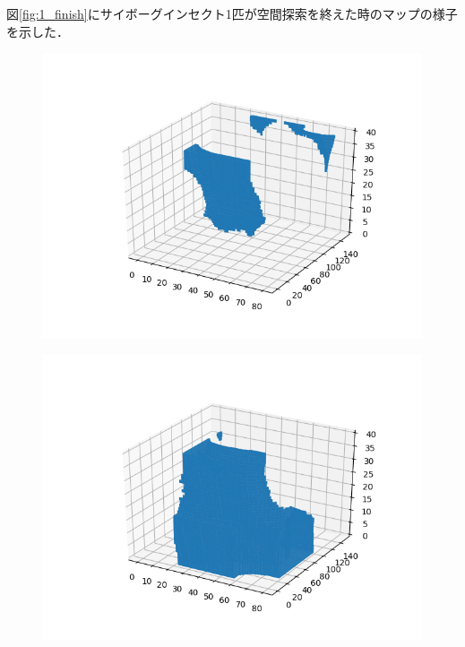 \documentclass[a4paper,11pt]{jarticle}
\begin{document}
	図\ref{fig:1_finish}にサイボーグインセクト1匹が空間探索を終えた時のマップの様子を示した．
	
	\begin{figure}
		\begin{minipage}{0.5\linewidth}
			\centering
			\includegraphics[width=1\linewidth]{png/Figure_49500.png}
			\label{fig:1-1}
		\end{minipage}
		\begin{minipage}{0.5\linewidth}
			\centering
			\includegraphics[width=1\linewidth]{png/Figure1_3_51000.png}
			\label{fig:1-2}
		\end{minipage}\\
		\begin{minipage}{0.5\linewidth}

\end{minipage}
\end{figure}
\end{document}
